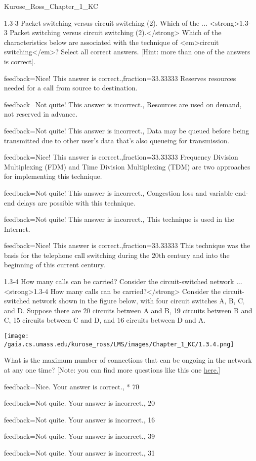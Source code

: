 \documentclass[a4paper,twocolumn]{article}
\begin{document}
\begin{quiz}{Kurose_Ross_Chapter_1_KC}
\begin{multi}[
	points=1,
	penalty=0.33333,
	multiple,
]{1.3-3 Packet switching versus circuit switching (2).  Which of the ...}
<strong>1.3-3 Packet switching versus circuit switching (2).</strong>  Which of the characteristics below are associated with the technique of <em>circuit switching</em>? Select all correct answers. [Hint: more than one of the answers is correct].
\item[feedback={Nice! This answer is correct.},fraction=33.33333] Reserves resources needed for a call from source to destination.
\item[feedback={Not quite! This answer is incorrect.},] Resources are used on demand, not reserved in advance.
\item[feedback={Not quite! This answer is incorrect.},] Data may be queued before being transmitted due to other user’s data that’s also queueing for transmission.
\item[feedback={Nice! This answer is correct.},fraction=33.33333] Frequency Division Multiplexing (FDM) and Time Division Multiplexing (TDM) are two approaches for implementing this technique.
\item[feedback={Not quite! This answer is incorrect.},] Congestion loss and variable end-end delays are possible with this technique.
\item[feedback={Not quite! This answer is incorrect.},] This technique is used in the Internet.
\item[feedback={Nice! This answer is correct.},fraction=33.33333] This technique was the basis for the telephone call switching during the 20th century and into the beginning of this current century.
\end{multi}

\begin{multi}[
	points=1,
	penalty=0.33333,
]{1.3-4 How many calls can be carried? Consider the circuit-switched network ...}
<strong>1.3-4 How many calls can be carried?</strong> Consider the circuit-switched network shown in the figure below, with  four circuit switches A, B, C, and D. Suppose there are 20 circuits between A and B, 19 circuits between B and C, 15 circuits between C and D, and 16 circuits between D and A. 
\begin{center}
\texttt{[image: /gaia.cs.umass.edu/kurose\_ross/LMS/images/Chapter\_1\_KC/1.3.4.png]}
\end{center}
 What is the maximum number of connections that can be ongoing in the network at any one time? [Note: you can find more questions like this one \href{http://gaia.cs.umass.edu/kurose_ross/interactive/circuit_switching.php}{here.]}
\item[feedback={Nice. Your answer is correct.},]* 70
\item[feedback={Not quite. Your answer is incorrect.},] 20
\item[feedback={Not quite. Your answer is incorrect.},] 16
\item[feedback={Not quite. Your answer is incorrect.},] 39
\item[feedback={Not quite. Your answer is incorrect.},] 31
\end{multi}


\end{quiz}
\end{document}

